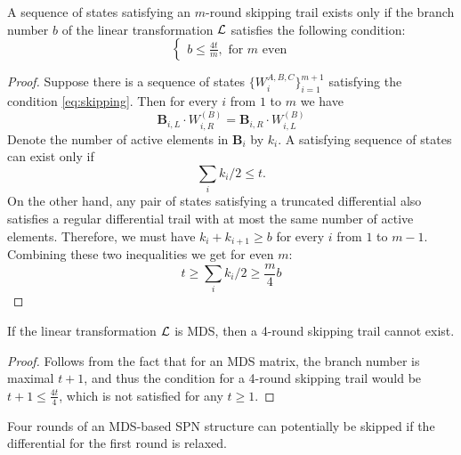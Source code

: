 \documentclass[11pt]{article}
\begin{document}
\begin{proposition}
 A sequence of states satisfying an $m$-round skipping trail exists only if the branch number $b$ of the linear transformation $\mathcal{L}$ satisfies the following condition:
\begin{equation}
    \begin{cases}
b\leq \frac{4t}{m},\text{ for } m \text{ even}  \end{cases}  \label{eq:skipping3}
\end{equation}\end{proposition}
\begin{proof}
    Suppose there is a sequence of states $\{W_i^{A,B,C}\}_{i=1}^{m+1}$ satisfying the condition \ref{eq:skipping}. Then for every $i$ from $1$ to $m$ we have
    \begin{equation}
        \mathbf{B}_{i,L}\cdot W_{i,R}^{(B)} = \mathbf{B}_{i,R}\cdot W_{i,L}^{(B)}\label{eq:skipping3}
    \end{equation}
    Denote the number of active elements in $\mathbf{B}_i$ by $k_i$. A satisfying sequence of states can exist only
    if $$
    \sum_i k_i/2    \leq t.
    $$
    On the other hand, any pair of states satisfying a truncated differential also satisfies a regular differential trail with at most
    the same number of active elements. Therefore, we must have $k_i+k_{i+1}\geq b$ for every $i$ from $1$ to $m-1$. Combining these two inequalities we get for even $m$:
    $$
    t \geq \sum_i k_i/2 \geq \frac{m}{4}b
    $$
\end{proof}


\begin{proposition}
    If the linear transformation $\mathcal{L}$ is MDS, then a 4-round skipping trail cannot exist.
\end{proposition}
\begin{proof}
    Follows from the fact that for an MDS matrix, the branch number is maximal $t+1$, and thus the condition for a 4-round skipping trail would
    be $t+1\leq \frac{4t}{4}$, which is not satisfied for any $t\geq 1$.
\end{proof}
\begin{remark}
   Four rounds of an MDS-based SPN structure can potentially be skipped if the differential for the first round is relaxed.
\end{remark}
\end{document}
